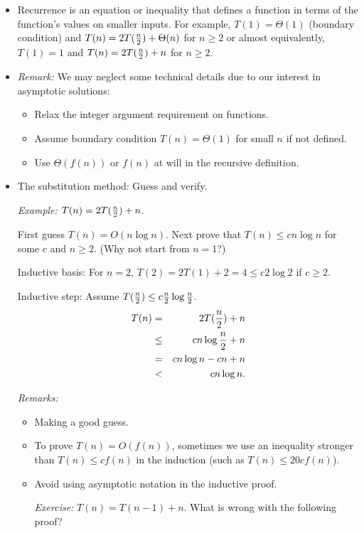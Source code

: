 \documentclass{article}
\begin{document}
\begin{itemize}

\item Recurrence is an equation or inequality that defines a function
in terms of the function's values on smaller inputs. For example,
$T(1)=\Theta(1)$ (boundary condition) and $T(n)=2T({n\over 2})+\Theta(n)$ for 
$n\ge 2$ or almost equivalently, $T(1)=1$ and $T(n)=2T({n\over2})+n$ for $n\ge2$.

\item {\em Remark:} We may neglect some technical details due to our
interest in asymptotic solutions: 
\begin{itemize}
\item Relax the integer argument requirement
on functions.
\item Assume boundary condition $T(n)=\Theta(1)$ for small $n$
if not defined.
\item Use $\Theta(f(n))$ or $f(n)$ at will in the recursive definition.
\end{itemize}

\item The substitution method: Guess and verify.

{\em Example:} $T(n)=2T({n\over2})+n$.

First guess $T(n)=O(n\log n)$. Next prove that 
$T(n)\le cn\log n$ for some $c$ and $n\ge 2$. (Why not start from $n=1$?)

Inductive basis: For $n=2$, $T(2)=2T(1)+2=4\le c2\log 2$ if $c\ge2$.

Inductive step: Assume $T({n\over2})\le c{n\over2}\log{n\over2}$.
\begin{eqnarray*}
T(n)&=&2T({n\over2})+n\\
&\le&cn\log{n\over2}+n\\
&=&cn\log n-cn+n\\
&<&cn\log n.
\end{eqnarray*}

{\em Remarks:}
\begin{itemize}
\item Making a good guess. 
\item To prove $T(n)=O(f(n))$, sometimes we use an inequality
stronger than $T(n)\le cf(n)$ in the induction (such as 
$T(n)\le 20cf(n)$).

\item Avoid using asymptotic notation in the inductive proof.

{\em Exercise:} $T(n)=T(n-1)+n$. What is wrong with the following proof?


\end{itemize}
\end{itemize}
\end{document}
